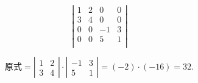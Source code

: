 \begin{frame}
  \begin{footnotesize}
    \begin{exampleblock}{15}
      $$
      \left|
      \begin{array}{rrrr}
        1&2&0&0\\
        3&4&0&0\\
        0&0&-1&3\\
        0&0&5&1\\
      \end{array}
      \right|
      $$
    \end{exampleblock}
    \pause 
    \jiename 
    $$
    \mbox{原式} = \left|
    \begin{array}{cc}
      1&2\\
      3&4      
    \end{array}
    \right| \cdot
    \left|
    \begin{array}{rr}
      -1&3\\
      5&1      
    \end{array}
    \right| = (-2)\cdot(-16)=32.
    $$
  \end{footnotesize}
\end{frame}


